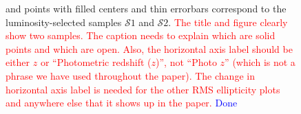 \documentclass[twocolumn,useAMS,usenatbib]{mn2e}
\newcommand{\rachel}[1]{{\textcolor{red}{#1}}}
\newcommand{\arun}[1]{{\textcolor{blue}{#1}}}
\newcommand{\s}{\ensuremath{\mathcal{S}}}
\begin{document}
\begin{figure}
{          and points with filled centers and thin errorbars correspond to the luminosity-selected samples \s$1$ and \s$2$.          
          \rachel{The title and figure clearly show two samples.  The caption needs to explain which are solid points and which are open. Also, the horizontal axis label should
           be either $z$ or ``Photometric redshift ($z$)'', not ``Photo $z$'' (which is not a phrase we have used throughout the paper).  
           The change in horizontal axis label is needed for the other RMS ellipticity plots and anywhere else that it shows up in the paper.} 
           \arun{Done}        
          }
 \label{fig:rms_ellip}

  
           
%           
\end{figure}
\end{document}
